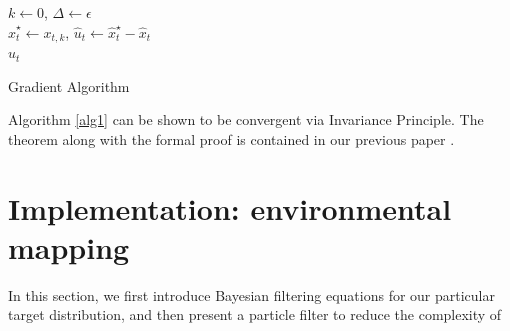 \documentclass[letterpaper, 10 pt, conference]{ieeeconf}
\newcommand{\Ram}[1]{{\normalsize{\textbf{({\color{green}Ram:\ }#1)}}}}
\newcommand{\HJ}[1]{{\color{black}{#1}}}
\begin{document}
{\tiny{
		\begin{algorithm}
			\DontPrintSemicolon
			$k \gets 0$, $\Delta \gets \epsilon$\\
$\hat{x}_t^{\star} \gets x_{t,k}$, $\hat{u}_{t}\gets \hat{x}_t^{\star} - \hat{x}_t$ \\
\Return $\hat{u}_t$
			\caption{Gradient Algorithm}\label{alg1}
		\end{algorithm}
}}
Algorithm \ref{alg1} can be shown to be convergent via Invariance Principle. The theorem along with the formal proof is contained in our previous paper \cite{park2014robust}.

\section{Implementation: environmental mapping}
\label{sec:sec6}
In this section, we first introduce Bayesian filtering equations for our particular target distribution, and then present a particle filter to reduce the complexity of \HJ{the map construction process.} 
\end{document}
